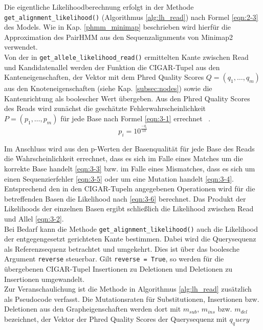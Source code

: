 Die eigentliche Likelihoodberechnung erfolgt in der Methode \lstinline|get_alignment_likelihood()| (Algorithmus \ref{alg:lh_read}) nach Formel \eqref{eqn:2-3} des Models. Wie in Kap. \ref{phmm_minimap} beschrieben wird hierfür die Approximation des PairHMM aus den Sequenzalignments von Minimap2 verwendet.\\

Von der in \lstinline|get_allele_likelihood_read()| ermittelten Kante zwischen Read und Kandidatenallel werden der Funktion die CIGAR-Tupel aus den Kanteneigenschaften, der Vektor mit dem  Phred Quality Scores $Q =(q_{1}, \dots, q_{m})$ aus den Knoteneigenschaften (siehe Kap. \ref {subsec:nodes}) sowie die Kantenrichtung als boolescher Wert übergeben. Aus den Phred Quality Scores des Reads wird zunächst die geschätzte Fehlerwahrscheinlichkeit $ P=(p_{1}, \dots, p_{m}) $ für jede Base nach Formel \eqref{eqn:3-1} errechnet ~\cite{ewing_1998}.  
\begin{equation} \label{eqn:3-1}
\tag{3-1}
p_{i} = 10^{\frac{-q_{i}}{10}}
\end{equation}

Im Anschluss wird aus den p-Werten der Basenqualität für jede Base des Reads die Wahrscheinlichkeit errechnet, dass es sich im Falle eines Matches um die korrekte Base handelt \eqref{eqn:3-3} bzw. im Falle eines Mismatches, dass es sich um einen Sequenzierfehler \eqref{eqn:3-5} oder um eine Mutation handelt \eqref{eqn:3-4}. Entsprechend den in den CIGAR-Tupeln angegebenen Operationen wird für die betreffenden Basen die Likelihood nach \eqref{eqn:3-6} berechnet. Das Produkt der Likelihoods der einzelnen Basen ergibt schließlich die Likelihood zwischen Read und Allel \eqref{eqn:3-2}.\\

Bei Bedarf kann die Methode \lstinline|get_alignment_likelihood()| auch  die Likelihood der entgegengesetzt gerichteten Kante bestimmen. Dabei wird die Querysequenz als Referenzsequenz betrachtet und umgekehrt. Dies ist über das boolesche Argument \lstinline|reverse| steuerbar. Gilt \lstinline|reverse = True|, so werden für die übergebenen CIGAR-Tupel Insertionen zu Deletionen und Deletionen zu Insertionen umgewandelt.\\

Zur Veranschaulichung ist die Methode in Algorithmus \ref{alg:lh_read} zusätzlich als Pseudocode verfasst. Die Mutationsraten für Substitutionen, Insertionen bzw. Deletionen aus den Grapheigenschaften werden dort mit $ m_{sub} $, $ m_{ins} $ bzw. $ m_{del} $ bezeichnet, der Vektor der Phred Quality Scores der Querysequenz mit $q_query$

